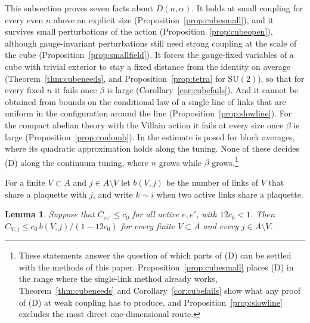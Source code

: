 \documentclass[aps,prd,twocolumn,superscriptaddress,nofootinbib,longbibliography,floatfix,amsmath,amssymb,10pt]{revtex4-2}
\newtheorem{lemma}[theorem]{Lemma}
\theoremstyle{definition}
\theoremstyle{remark}
\newcommand{\SU}{\mathrm{SU}}
\begin{document}
This subsection proves seven facts about $D(n,\alpha)$. It holds at small
coupling for every even $n$ above an explicit size
(Proposition~\ref{prop:cubesmall}), and it survives small perturbations of
the action (Proposition~\ref{prop:cubeopen}), although gauge-invariant
perturbations still need strong coupling at the scale of the cube
(Proposition~\ref{prop:smallfield}). It forces the gauge-fixed variables of a
cube with trivial exterior to stay a fixed distance from the identity on
average (Theorem~\ref{thm:cubeneeds}, and Proposition~\ref{prop:tetra} for
$\SU(2)$), so that for every fixed $n$ it fails
once $\beta$ is large (Corollary~\ref{cor:cubefails}). And it cannot be
obtained from bounds on the conditional law of a single line of links that
are uniform in the configuration around the line
(Proposition~\ref{prop:slowline}). For the compact abelian theory with
the Villain action it fails at every size once $\beta$ is large
(Proposition~\ref{prop:coulomb}). In \cite[Sec.~XII\,A]{BBLR26} the
estimate is posed for block averages, where its quadratic approximation
holds along the tuning. None of these decides (D) along the
continuum tuning, where $n$ grows while $\beta$ grows.\footnote{These
statements answer the question of which parts of (D) can be settled with
the methods of this paper. Proposition~\ref{prop:cubesmall} places (D) in the range where the
single-link method already works, Theorem~\ref{thm:cubeneeds} and Corollary~\ref{cor:cubefails} show what any proof
of (D) at weak coupling has to produce, and Proposition~\ref{prop:slowline} excludes the most
direct one-dimensional route. }

For a finite $V\subset A$ and $j\in A\setminus V$ let $b(V,j)$ be the number
of links of $V$ that share a plaquette with $j$, and write $k\sim i$ when two
active links share a plaquette.

\begin{lemma}\label{lem:cubesingle}
Suppose that $C_{ee'}\le c_0$ for all active $e,e'$, with $12c_0<1$. Then
$C_{V,j}\le c_0\,b(V,j)/(1-12c_0)$ for every finite $V\subset A$ and every
$j\in A\setminus V$.
\end{lemma}
\end{document}
